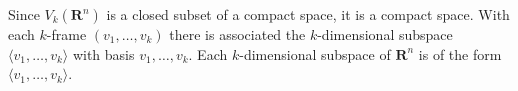Since $V_k(\mathbf{R}^n)$ is a closed subset of a compact space, it is a compact space. With each $k$-frame $(v_1, \ldots, v_k)$ there is associated the $k$-dimensional subspace $\langle v_1, \ldots, v_k \rangle$ with basis $v_1, \ldots, v_k$. Each $k$-dimensional subspace of $\mathbf{R}^n$ is of the form $\langle v_1, \ldots, v_k \rangle$.
